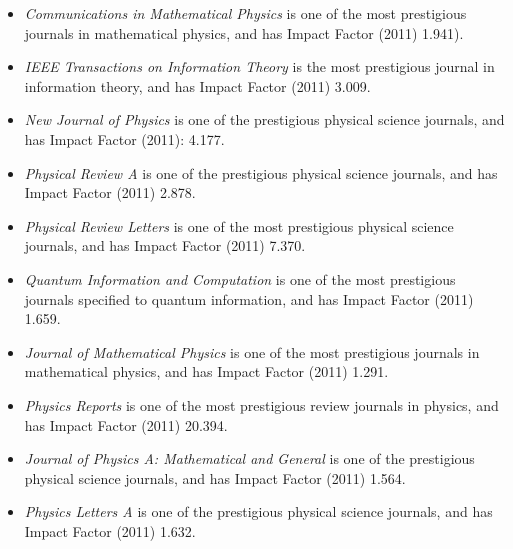 \documentclass[a4paper,12pt,oneside]{article}
\begin{document}
\begin{itemize}
\item {\em Communications in Mathematical Physics}
is one of the most prestigious journals in mathematical physics, and has Impact Factor
(2011) 1.941).

\item {\em IEEE Transactions on Information Theory}
is the most prestigious journal in information theory, and has
Impact Factor (2011) 3.009.

\item {\em New Journal of Physics}
is one of the prestigious physical science journals, and has Impact Factor (2011): 4.177.

\item {\em Physical Review A}
is one of the prestigious physical science journals, and has Impact Factor (2011) 2.878.

\item {\em Physical Review Letters} 
is one of the most prestigious physical science journals, and has Impact Factor
(2011) 7.370.

\item {\em Quantum Information and Computation}
is one of the most prestigious journals specified to quantum information, and has Impact Factor (2011) 1.659.

\item {\em Journal of Mathematical Physics}
is one of the most prestigious journals in mathematical physics, and has Impact Factor
(2011) 1.291.

\item {\em Physics Reports}
is one of the most prestigious review journals in physics, and has Impact Factor (2011) 20.394.

\item {\em Journal of Physics A: Mathematical and General}
is one of the prestigious physical science journals, and has Impact Factor (2011) 1.564.

\item {\em Physics Letters A}
is one of the prestigious physical science journals, and has Impact Factor (2011) 1.632.
\end{itemize}
\fi
\end{document}
